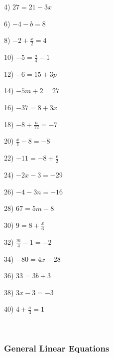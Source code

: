 \begin{multicols}{2}
  4) $27 = 21 - 3 x$
  
  6) $- 4 - b = 8$
  
  8) $- 2 + \frac{x}{2} = 4$
  
  10) $- 5 = \frac{a}{4} - 1$
  
  12) $- 6 = 15 + 3 p$
  
  14) $- 5 m + 2 = 27$
  
  16) $- 37 = 8 + 3 x$
  
  18) $- 8 + \frac{n}{12} = - 7$
  
  20) $\frac{x}{1} - 8 = - 8$
  
  22) $- 11 = - 8 + \frac{v}{2}$
  
  24) $- 2 x - 3 = - 29$
  
  26) $- 4 - 3 n = - 16$
  
  28) $67 = 5 m - 8$
  
  30) $9 = 8 + \frac{x}{6}$
  
  32) $\frac{m}{4} - 1 = - 2$
  
  34) $- 80 = 4 x - 28$
  
  36) $33 = 3 b + 3$
  
  38) $3 x - 3 = - 3$
  
  40) $4 + \frac{a}{3} = 1$
\end{multicols}

\vspace{2in}
~

\pagebreak

\subsubsection{General Linear Equations}\par

{}

